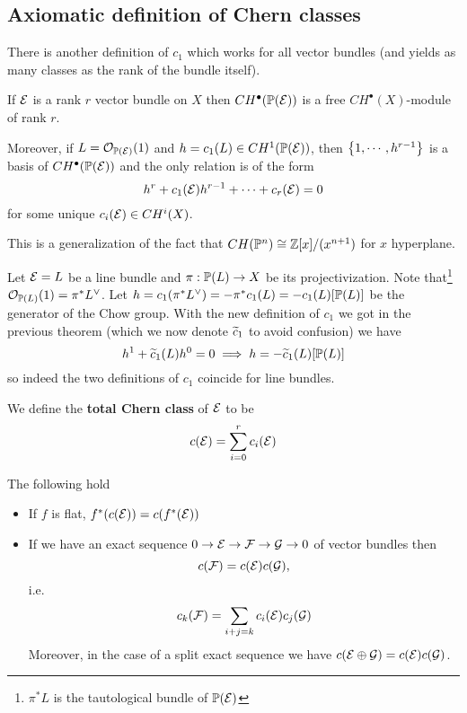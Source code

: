 \subsection{Axiomatic definition of Chern classes}
There is another definition of $c_1$ which works for all vector bundles (and yields as many classes as the rank of the bundle itself). 

\begin{theorem}[]
If $\mathcal{E}$ is a rank $r$ vector bundle on $X$ then
$CH^\bullet(\mathbb{P}(\mathcal{E}))$ is a free $CH^\bullet(X)$-module of rank $r$. 

Moreover, if $L=\mathcal{O}_{\mathbb{P}(\mathcal{E})}(1)$ and $h=c_1(L)\in CH^1(\mathbb{P}(\mathcal{E}))$, then $\left\{{1,\cdots, h^{r-1}}\right\}$ is a basis of $CH^\bullet(\mathbb{P}(\mathcal{E}))$ and the only relation is of the form
\[h^r+c_1(\mathcal{E})h^{r-1}+\cdots+c_r(\mathcal{E})=0\]
for some unique $c_i(\mathcal{E})\in CH^i(X)$.
\end{theorem}

\begin{remark}
This is a generalization of the fact that $CH(\mathbb{P}^n)\cong \mathbb{Z}[x]/(x^{n+1})$ for $x$ hyperplane.
\end{remark}


\begin{example}
Let $\mathcal{E}=L$ be a line bundle and $\pi:\mathbb{P}(L)\to X$ be its projectivization. Note that\footnote{$\pi^\ast L$ is the tautological bundle of $\mathbb{P}(\mathcal{E})$} $\mathcal{O}_{\mathbb{P}(L)}(1)=\pi^\ast L^\vee$. 
Let $h=c_1(\pi^\ast L^\vee)=-\pi^\ast c_1(L)=-c_1(L)[\mathbb{P}(L)]$ be the generator of the Chow group. With the new definition of $c_1$ we got in the previous theorem (which we now denote $\widetilde{c}_1$ to avoid confusion) we have
\[h^1+\widetilde{c}_1(L)h^0=0\implies h=-\widetilde{c}_1(L)[\mathbb{P}(L)]\]
so indeed the two definitions of $c_1$ coincide for line bundles.
\end{example}



\begin{definition}[]
We define the \textbf{total Chern class} of $\mathcal{E}$ to be
\[c(\mathcal{E})=\sum_{i=0}^rc_i(\mathcal{E})\]
\end{definition}

\begin{proposition}[]
The following hold
\begin{itemize}
\item If $f$ is flat, $f^\ast(c(\mathcal{E}))=c(f^\ast(\mathcal{E}))$
\item If we have an exact sequence $0\to \mathcal{E}\to \mathcal{F}\to \mathcal{G}\to 0$ of vector bundles then
\[c(\mathcal{F})=c(\mathcal{E})c(\mathcal{G}),\]
i.e.
\[c_k(\mathcal{F})=\sum_{i+j=k}c_i(\mathcal{E})c_j(\mathcal{G})\]
Moreover, in the case of a split exact sequence we have $c(\mathcal{E}\oplus \mathcal{G})=c(\mathcal{E})c(\mathcal{G})$.
\end{itemize}
\end{proposition}

